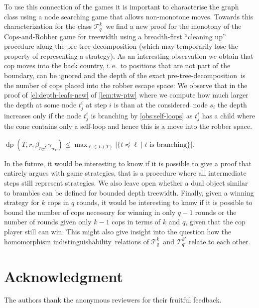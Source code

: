 \documentclass{lmcs}
\theoremstyle{plain}\newtheorem{claim}[thm]{Claim}   %
\newcommand{\cT}{\ensuremath{\mathcal T}}
\DeclareMathOperator{\dep}{dp}
\newcommand	{\homInd}			{homomorphism indistinguishability}
\newcommand{\Ekq}{\ensuremath{\cT_{q}^{k}}}
\newcommand{\EParam}[2]{\ensuremath{\cT_{#2}^{#1}}}
\newcommand{\preTreeDec}{pre-tree-decomposition}
\newcommand{\considered}{considered}
\begin{document}
To use this connection of the games it is important to characterise the graph class using a node searching game that allows non-monotone moves.
Towards this characterization for the class \Ekq\ we find a new proof for the monotony of the Cops-and-Robber game for treewidth using a breadth-first \enquote{cleaning up} procedure along the pre-tree-decomposition (which may temporarily lose the property of representing a strategy).
As an interesting observation we obtain that cop moves into the back country, i.\,e.~to positions that are not part of the boundary, can be ignored and the depth of the exact \preTreeDec\ is the number of cops placed into the robber escape space:
We observe that in the proof of \autoref{cl:depth-leafs-new} of \autoref{lem:tw-ptw} where we compute how much larger the depth at some node $t^i_j$ at step $i$ is than at the \considered\ node $s_i$ the depth increases only if the node $t^i_j$ is branching by \autoref{obs:self-loops} as $t^i_j$ has a child where the cone contains only a self-loop and hence this is a move into the robber space.
\begin{cor}
	$\dep(T,r,\beta_{n_T},\gamma_{n_T})\leq \max_{\ell\in L(T)} |\{t\preceq \ell\mid t \text{ is branching} \}|$.
\end{cor}

In the future, it would be interesting to know if it is possible to give a proof that entirely argues with game strategies, that is a procedure where all intermediate steps still represent strategies.
We also leave open whether a dual object similar to brambles can be defined for bounded depth treewidth. 
Finally, given a winning strategy for $k$ cops in $q$ rounds, it would be interesting to know if it is possible to bound the number of cops necessary for winning in only $q-1$ rounds or the number of rounds given only $k-1$ cops in terms of $k$ and $q$, given that the cop player still can win.
This might also give insight into the question how the \homInd\ relations of \Ekq\ and $\EParam{k'}{q'}$ relate to each other.

\section*{Acknowledgment}
\noindent The authors thank the anonymous reviewers for their fruitful feedback.



\end{document}
